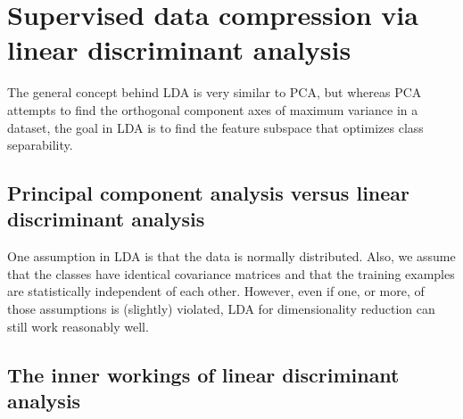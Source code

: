 \section{Supervised data compression via linear discriminant analysis}
The general concept behind LDA is very similar to PCA, but whereas PCA attempts to find the orthogonal component axes of maximum variance in a dataset, the goal in LDA is to find the feature subspace that optimizes class separability.

\subsection{Principal component analysis versus linear discriminant analysis}
One assumption in LDA is that the data is normally distributed. Also, we assume that the classes have identical covariance matrices and that the training examples are statistically independent of each other. However, even if one, or more, of those assumptions is (slightly) violated, LDA for dimensionality reduction can still work reasonably well.

\subsection{The inner workings of linear discriminant analysis}